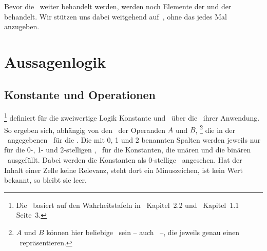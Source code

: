 Bevor die \Schlussregel\ weiter behandelt werden, werden noch Elemente der \emph{\Aussagenlogik} und der \emph{\Praedikatenlogik} behandelt.
Wir stützen uns dabei weitgehend auf~\cite{bib:Rautenberg}, ohne das jedes Mal anzugeben.

\section{Aussagenlogik}%
\label{sec:Aussagenlogik}

\subsection{Konstante und Operationen}%
\label{sub:Operationen}

%
\footnote{%
	Die \tablename\ basiert auf den Wahrheitstafeln in~\cite{bib:Junktor} Kapitel~2.2 und~\cite{bib:Rautenberg} Kapitel~1.1 Seite~3.
}
definiert für die zweiwertige Logik Konstante und \Junktoren\ über die \Wahrheitswerte\ ihrer Anwendung.
So ergeben sich, abhängig von den \Wahrheitswerten\ der Operanden $A$ und $B$,%
\footnote{%
	$A$ und $B$ können hier beliebige \Aussagen\ sein -- auch \Formeln\ --, die jeweils genau einen \Wahrheitswert\ repräsentieren.
}
die in der \tablename\ angegebenen \Wahrheitswerte\ für die \Operationen.
Die mit 0, 1 und 2 benannten Spalten werden jeweils nur für die 0-, 1- und 2-stelligen \Junktoren, \textdh\ für die Konstanten, die unären und die binären \Junktoren\ ausgefüllt.
Dabei werden die Konstanten als 0-stellige \Junktoren\ angesehen.
Hat der Inhalt einer Zelle keine Relevanz, steht dort ein Minuszeichen, ist kein Wert bekannt, so bleibt sie leer.

